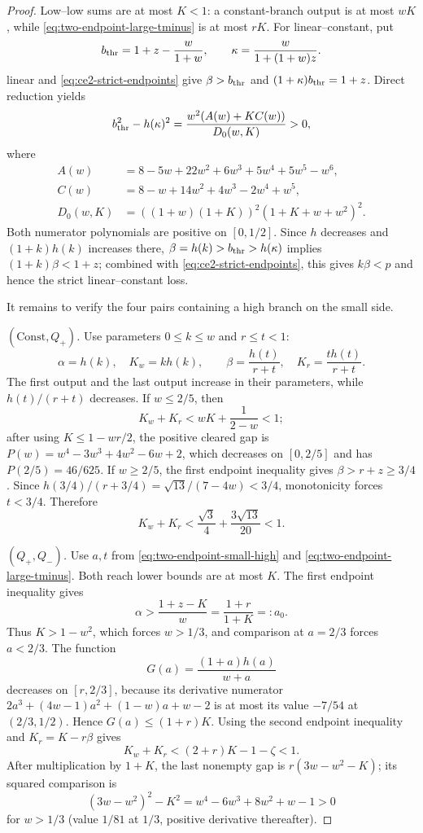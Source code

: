 \begin{proof}
Low--low sums are at most $K<1$: a constant-branch output is at most $wK$, while
\eqref{eq:two-endpoint-large-tminus} is at most $rK$.  For linear--constant, put
\[
 b_{\rm thr}=1+z-\frac{w}{1+w},\qquad
 \kappa=\frac{w}{1+(1+w)z}.
\]
linear and \eqref{eq:ce2-strict-endpoints} give $\beta>b_{\rm thr}$ and
$(1+\kappa)b_{\rm thr}=1+z$.  Direct reduction yields
\[
 b_{\rm thr}^2-h(\kappa)^2
 =\frac{w^2(A(w)+KC(w))}{D_0(w,K)}>0,
\]
where
\begin{align*}
 A(w)&=8-5w+22w^2+6w^3+5w^4+5w^5-w^6,\\
 C(w)&=8-w+14w^2+4w^3-2w^4+w^5,\\
 D_0(w,K)&=((1+w)(1+K))^2(1+K+w+w^2)^2.
\end{align*}
Both numerator polynomials are positive on $[0,1/2]$.  Since $h$ decreases
and $(1+k)h(k)$ increases there,
$\beta=h(k)>b_{\rm thr}>h(\kappa)$ implies
$(1+k)\beta<1+z$; combined with \eqref{eq:ce2-strict-endpoints}, this gives
$k\beta<p$ and hence the strict linear--constant loss.

It remains to verify the four pairs containing a high branch on the small
side.

\smallskip\noindent
\emph{$(\mathrm{Const},Q_+)$.}
Use parameters $0\le k\le w$ and $r\le t<1$:
\[
 \alpha=h(k),\quad K_w=kh(k),\qquad
 \beta=\frac{h(t)}{r+t},\quad K_r=\frac{th(t)}{r+t}.
\]
The first output and the last output increase in their parameters, while
$h(t)/(r+t)$ decreases.  If $w\le2/5$, then
\[
 K_w+K_r<wK+\frac1{2-w}<1;
\]
after using $K\le1-wr/2$, the positive cleared gap is
$P(w)=w^4-3w^3+4w^2-6w+2$, which decreases on $[0,2/5]$ and has
$P(2/5)=46/625$.  If $w\ge2/5$, the first endpoint inequality gives
$\beta>r+z\ge3/4$.  Since
$h(3/4)/(r+3/4)=\sqrt{13}/(7-4w)<3/4$, monotonicity forces $t<3/4$.
Therefore
\[
 K_w+K_r<\frac{\sqrt3}{4}+\frac{3\sqrt{13}}{20}<1.
\]

\smallskip\noindent
\emph{$(Q_+,Q_-)$.}
Use $a,t$ from \eqref{eq:two-endpoint-small-high} and
\eqref{eq:two-endpoint-large-tminus}.  Both reach lower bounds are at most $K$.
The first endpoint inequality gives
\[
 \alpha>\frac{1+z-K}{w}=\frac{1+r}{1+K}=:a_0.
\]
Thus $K>1-w^2$, which forces $w>1/3$, and comparison at $a=2/3$ forces
$a<2/3$.  The function
\[
 G(a)=\frac{(1+a)h(a)}{w+a}
\]
decreases on $[r,2/3]$, because its derivative numerator
$2a^3+(4w-1)a^2+(1-w)a+w-2$ is at most its value
$-7/54$ at $(2/3,1/2)$.  Hence $G(a)\le(1+r)K$.
Using the second endpoint inequality and
$K_r=K-r\beta$ gives
\[
 K_w+K_r<(2+r)K-1-\zeta<1.
\]
After multiplication by $1+K$, the last nonempty gap is
$r(3w-w^2-K)$; its squared comparison is
\[
 (3w-w^2)^2-K^2=w^4-6w^3+8w^2+w-1>0
\]
for $w>1/3$ (value $1/81$ at $1/3$, positive derivative thereafter).


\end{proof}
